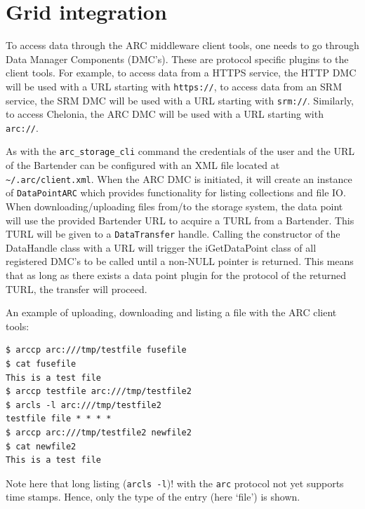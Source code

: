 \documentclass{book}
\begin{document}

\section{Grid integration} %
\label{sec:grid_integration}

To access data through the ARC middleware client tools, one needs to go through Data Manager Components (DMC's). These are protocol specific plugins to the client tools. For example, to access data from a HTTPS service, the HTTP DMC will be used with a URL starting with \verb!https://!, to access data from an SRM service, the SRM DMC will be used with a URL starting with \verb!srm://!. Similarly, to access Chelonia, the ARC DMC will be used with a URL starting with \verb!arc://!. 

As with the \verb!arc_storage_cli! command the credentials of the user and the URL of the Bartender can be configured with an XML file located at \verb!~/.arc/client.xml!. When the ARC DMC is initiated, it will create an instance of \verb!DataPointARC! which provides functionality for listing collections and file IO. When downloading/uploading files from/to the storage system, the data point will use the provided Bartender URL to acquire a TURL from a Bartender. This TURL will be given to a \verb!DataTransfer! handle. Calling the constructor of the DataHandle class with a URL will trigger the iGetDataPoint class of all registered DMC's to be called until a non-NULL pointer is returned. This means that as long as there exists a data point plugin for the protocol of the returned TURL, the transfer will proceed.

An example of uploading, downloading and listing a file with the ARC client tools:

\begin{verbatim}
$ arccp arc:///tmp/testfile fusefile
$ cat fusefile
This is a test file
$ arccp testfile arc:///tmp/testfile2
$ arcls -l arc:///tmp/testfile2
testfile file * * * *
$ arccp arc:///tmp/testfile2 newfile2
$ cat newfile2
This is a test file
\end{verbatim}

Note here that long listing (\verb!arcls -l!)! with the \verb!arc! protocol not yet supports time stamps. Hence, only the type of the entry (here `file') is shown.



% 
\end{document}
